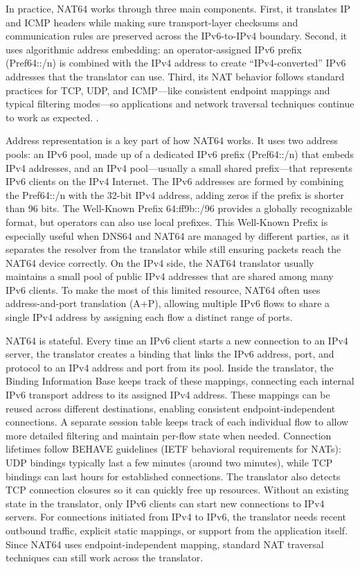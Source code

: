 In practice, NAT64 works through three main components. First, it translates IP and ICMP headers while making sure transport-layer checksums and communication rules are preserved across the IPv6-to-IPv4 boundary. Second, it uses algorithmic address embedding: an operator-assigned IPv6 prefix (Pref64::/n) is combined with the IPv4 address to create “IPv4-converted” IPv6 addresses that the translator can use. Third, its NAT behavior follows standard practices for TCP, UDP, and ICMP—like consistent endpoint mappings and typical filtering modes—so applications and network traversal techniques continue to work as expected. \cite{rfc6146,6231295}.

Address representation is a key part of how NAT64 works. It uses two address pools: an IPv6 pool, made up of a dedicated IPv6 prefix (Pref64::/n) that embeds IPv4 addresses, and an IPv4 pool—usually a small shared prefix—that represents IPv6 clients on the IPv4 Internet. The IPv6 addresses are formed by combining the Pref64::/n with the 32-bit IPv4 address, adding zeros if the prefix is shorter than 96 bits. The Well-Known Prefix 64:ff9b::/96 provides a globally recognizable format, but operators can also use local prefixes. This Well-Known Prefix is especially useful when DNS64 and NAT64 are managed by different parties, as it separates the resolver from the translator while still ensuring packets reach the NAT64 device correctly. On the IPv4 side, the NAT64 translator usually maintains a small pool of public IPv4 addresses that are shared among many IPv6 clients. To make the most of this limited resource, NAT64 often uses address-and-port translation (A+P), allowing multiple IPv6 flows to share a single IPv4 address by assigning each flow a distinct range of ports\cite{6231295,rfc6146}.

NAT64 is stateful. Every time an IPv6 client starts a new connection to an IPv4 server, the translator creates a binding that links the IPv6 address, port, and protocol to an IPv4 address and port from its pool. Inside the translator, the Binding Information Base keeps track of these mappings, connecting each internal IPv6 transport address to its assigned IPv4 address. These mappings can be reused across different destinations, enabling consistent  endpoint-independent connections. A separate session table keeps track of each individual flow to allow more detailed filtering and maintain per-flow state when needed. 
Connection lifetimes follow BEHAVE guidelines (IETF behavioral requirements for NATs): UDP bindings typically last a few minutes (around two minutes), while TCP bindings can last hours for established connections. The translator also detects TCP connection closures so it can quickly free up resources. Without an existing state in the translator, only IPv6 clients can start new connections to IPv4 servers. For connections initiated from IPv4 to IPv6, the translator needs recent outbound traffic, explicit static mappings, or support from the application itself. 
Since NAT64 uses endpoint-independent mapping, standard NAT traversal techniques can still work across the translator\cite{6231295,rfc6146}.

